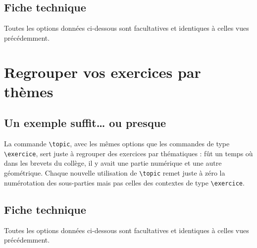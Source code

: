 \documentclass[12pt,a4paper]{scrartcl}
\begin{document}
\resetallcnt{}

\begin{tcblisting}{}
\exercise
\subpart
\subpart

\exercise
\subpart
\subpart
\end{tcblisting}


    \subsection{Fiche technique}

Toutes les options données ci-dessous sont facultatives et identiques à celles vues précédemment.

\bigskip



\exosoptions{}



\section{Regrouper vos exercices par thèmes}

    \subsection{Un exemple suffit\dots{} ou presque}

La commande \verb+\topic+, avec les mêmes options que les commandes de type \verb+\exercice+, sert juste à regrouper des exercices par thématiques : fût un temps où dans les brevets du collège, il y avait une partie numérique et une autre géométrique.
Chaque nouvelle utilisation de \verb+\topic+ remet juste à zéro la numérotation des sous-parties mais pas celles des contextes de type \verb+\exercice+.

\resetallcnt{}

\begin{tcblisting}{}
\topic
\exercise
\exercise

\topic
\exercise
\end{tcblisting}


    \subsection{Fiche technique}

Toutes les options données ci-dessous sont facultatives et identiques à celles vues précédemment.
\end{document}

